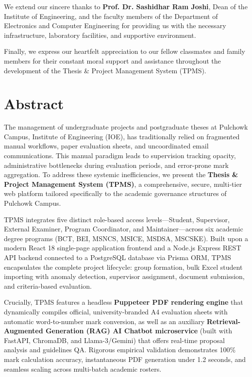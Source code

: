 \documentclass[12pt]{report}
\begin{document}
We extend our sincere thanks to \textbf{Prof. Dr. Sashidhar Ram Joshi}, Dean of the Institute of Engineering, and the faculty members of the Department of Electronics and Computer Engineering for providing us with the necessary infrastructure, laboratory facilities, and supportive environment.

Finally, we express our heartfelt appreciation to our fellow classmates and family members for their constant moral support and assistance throughout the development of the Thesis \& Project Management System (TPMS).

\chapter*{Abstract}
The management of undergraduate projects and postgraduate theses at Pulchowk Campus, Institute of Engineering (IOE), has traditionally relied on fragmented manual workflows, paper evaluation sheets, and uncoordinated email communications. This manual paradigm leads to supervision tracking opacity, administrative bottlenecks during evaluation periods, and error-prone mark aggregation. To address these systemic inefficiencies, we present the \textbf{Thesis \& Project Management System (TPMS)}, a comprehensive, secure, multi-tier web platform tailored specifically to the academic governance structures of Pulchowk Campus.

TPMS integrates five distinct role-based access levels—Student, Supervisor, External Examiner, Program Coordinator, and Maintainer—across six academic degree programs (BCT, BEI, MSNCS, MSICE, MSDSA, MSCSKE). Built upon a modern React 18 single-page application frontend and a Node.js Express REST API backend connected to a PostgreSQL database via Prisma ORM, TPMS encapsulates the complete project lifecycle: group formation, bulk Excel student importing with anomaly detection, supervisor assignment, document submission, and criteria-based evaluation.

Crucially, TPMS features a headless \textbf{Puppeteer PDF rendering engine} that dynamically compiles official, university-branded A4 evaluation sheets with automatic word-to-number mark conversion, as well as an auxiliary \textbf{Retrieval-Augmented Generation (RAG) AI Chatbot microservice} (built with FastAPI, ChromaDB, and Llama-3/Gemini) that offers real-time proposal analysis and guidelines QA. Rigorous empirical validation demonstrates 100\% mark calculation accuracy, instantaneous PDF generation under 1.2 seconds, and seamless scaling across multi-batch academic rosters.\\
\end{document}
